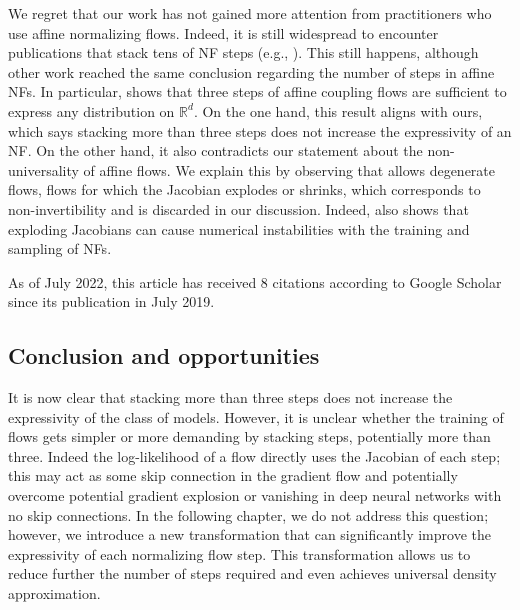 We regret that our work has not gained more attention from practitioners who use affine normalizing flows. Indeed, it is still widespread to encounter publications that stack tens of NF steps (e.g., \citep{daxamortized}). This still happens, although other work reached the same conclusion regarding the number of steps in affine NFs. In particular, \citet{koehler2021representational} shows that three steps of affine coupling flows are sufficient to express any distribution on $\mathbb{R}^d$. On the one hand, this result aligns with ours, which says stacking more than three steps does not increase the expressivity of an NF.
On the other hand, it also contradicts our statement about the non-universality of affine flows. We explain this by observing that \citet{koehler2021representational} allows degenerate flows, flows for which the Jacobian explodes or shrinks, which corresponds to non-invertibility and is discarded in our discussion. Indeed, \citet{behrmann2021understanding} also shows that exploding Jacobians can cause numerical instabilities with the training and sampling of NFs.

As of July 2022, this article has received 8 citations according to Google Scholar since its publication in July 2019.
\subsection{Conclusion and opportunities}
It is now clear that stacking more than three steps does not increase the expressivity of the class of models. However, it is unclear whether the training of flows gets simpler or more demanding by stacking steps, potentially more than three. Indeed the log-likelihood of a flow directly uses the Jacobian of each step; this may act as some skip connection in the gradient flow and potentially overcome potential gradient explosion or vanishing in deep neural networks with no skip connections. In the following chapter, we do not address this question; however, we introduce a new transformation that can significantly improve the expressivity of each normalizing flow step. This transformation allows us to reduce further the number of steps required and even achieves universal density approximation.
